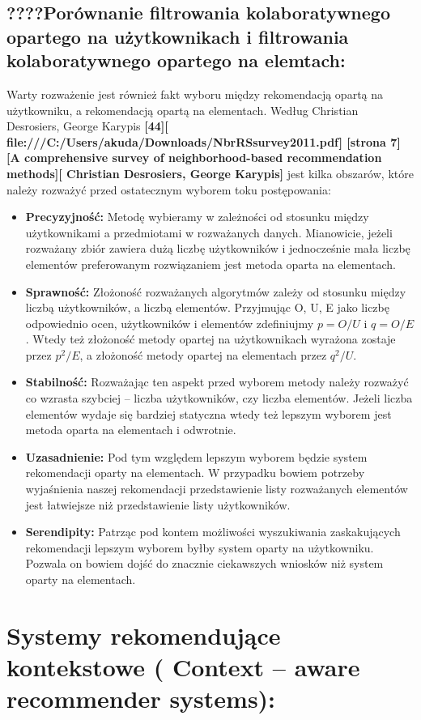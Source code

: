 \documentclass[12pt,a4paper]{report}
\begin{document}
{\subsection{????Porównanie filtrowania kolaboratywnego opartego na użytkownikach i filtrowania kolaboratywnego opartego na elemtach:}
Warty rozważenie jest również fakt wyboru między rekomendacją opartą na użytkowniku, a rekomendacją opartą na elementach. Według Christian Desrosiers, George Karypis \textbf{[44][ file:///C:/Users/akuda/Downloads/NbrRSsurvey2011.pdf] [strona 7] [A comprehensive survey of neighborhood-based recommendation methods][ Christian Desrosiers, George Karypis]} jest kilka obszarów, które należy rozważyć przed ostatecznym wyborem toku postępowania:
\begin{itemize}
\item \textbf{Precyzyjność:} Metodę wybieramy w zależności od stosunku między użytkownikami a przedmiotami w rozważanych danych. Mianowicie, jeżeli rozważany zbiór zawiera dużą liczbę użytkowników i jednocześnie mała liczbę elementów preferowanym rozwiązaniem jest metoda oparta na elementach.
\item \textbf{Sprawność:} Złożoność rozważanych algorytmów zależy od stosunku między liczbą użytkowników, a liczbą elementów. Przyjmując O, U, E jako liczbę odpowiednio ocen, użytkowników i elementów zdefiniujmy 
$p = O/U$ i $q = O/E$. Wtedy też złożoność metody opartej na użytkownikach wyrażona zostaje przez $p^2/E$, a złożoność metody opartej na elementach przez $q^2/U$.
\item \textbf{Stabilność:} Rozważając ten aspekt przed wyborem metody należy rozważyć co wzrasta szybciej – liczba użytkowników, czy liczba elementów. Jeżeli liczba elementów wydaje się bardziej statyczna wtedy też lepszym wyborem jest metoda oparta na elementach i odwrotnie.
\item \textbf{Uzasadnienie:} Pod tym względem lepszym wyborem będzie system rekomendacji oparty na elementach. W przypadku bowiem potrzeby wyjaśnienia naszej rekomendacji przedstawienie listy rozważanych elementów jest łatwiejsze niż przedstawienie listy użytkowników.
\item \textbf{Serendipity:} Patrząc pod kontem możliwości wyszukiwania zaskakujących rekomendacji lepszym wyborem byłby system oparty na użytkowniku. Pozwala on bowiem dojść do znacznie ciekawszych wniosków niż system oparty na elementach.
\end{itemize}




\section{Systemy rekomendujące kontekstowe ( Context – aware recommender systems):}

}
\end{document}
